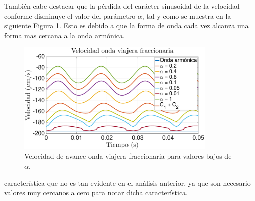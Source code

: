 También cabe destacar que la pérdida del carácter sinusoidal de la velocidad conforme disminuye el valor del parámetro $\alpha$, tal y como se muestra en la siguiente Figura \ref{fig:VCFB2}. Esto es debido a que la forma de onda cada vez alcanza una forma mas cercana a la onda armónica.
\begin{figure}[!h] %
	\vspace*{3mm}
    \centering
    \includegraphics[width=0.85\textwidth]{Figuras/VCFB2}
  	\caption{Velocidad de avance onda viajera fraccionaria para valores bajos de $\alpha$.}
  	\label{fig:VCFB2}
\end{figure}
característica que no es tan evidente en el análisis anterior, ya que son necesario valores muy cercanos a cero para notar dicha característica.




